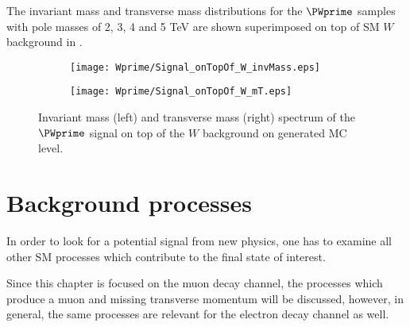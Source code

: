 The invariant mass and transverse mass distributions for the $\PWprime$ samples with pole masses of 2, 3, 4 and 5 TeV are shown superimposed on top of SM $W$ background in .

\begin{figure}
\begin{subfigure}{.5\textwidth}
  \centering
  \texttt{[image: Wprime/Signal\_onTopOf\_W\_invMass.eps]}
\end{subfigure}%
\begin{subfigure}{.5\textwidth}
  \centering
  \texttt{[image: Wprime/Signal\_onTopOf\_W\_mT.eps]}
\end{subfigure}
\caption{Invariant mass (left) and transverse mass (right) spectrum of the $\PWprime$ signal on top of the $W$ background on generated MC level.}
  \label{fig:signal_with_W}
\end{figure}



\section{Background processes}
\label{sec:wprimeBackgrounds}

In order to look for a potential signal from  new physics, one has to examine all other SM processes which contribute to the final state of interest.


Since this chapter is focused on the muon decay channel, the processes which produce a muon and missing transverse momentum will be discussed, 
however, in general, the same processes are relevant for the electron decay channel as well.

